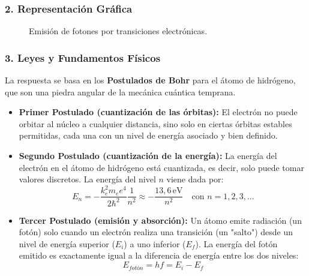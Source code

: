 \subsubsection*{2. Representación Gráfica}
\begin{figure}[H]
    \centering
    \caption{Emisión de fotones por transiciones electrónicas.}
\end{figure}

\subsubsection*{3. Leyes y Fundamentos Físicos}
La respuesta se basa en los \textbf{Postulados de Bohr} para el átomo de hidrógeno, que son una piedra angular de la mecánica cuántica temprana.
\begin{itemize}
    \item \textbf{Primer Postulado (cuantización de las órbitas):} El electrón no puede orbitar al núcleo a cualquier distancia, sino solo en ciertas órbitas estables permitidas, cada una con un nivel de energía asociado y bien definido.
    \item \textbf{Segundo Postulado (cuantización de la energía):} La energía del electrón en el átomo de hidrógeno está cuantizada, es decir, solo puede tomar valores discretos. La energía del nivel $n$ viene dada por:
    $$E_n = -\frac{k_e^2 m_e e^4}{2\hbar^2} \frac{1}{n^2} \approx -\frac{13,6 \, \text{eV}}{n^2} \quad \text{con } n=1, 2, 3, ...$$
    \item \textbf{Tercer Postulado (emisión y absorción):} Un átomo emite radiación (un fotón) solo cuando un electrón realiza una transición (un "salto") desde un nivel de energía superior ($E_i$) a uno inferior ($E_f$). La energía del fotón emitido es exactamente igual a la diferencia de energía entre los dos niveles:
    $$E_{fotón} = hf = E_i - E_f$$
\end{itemize}

